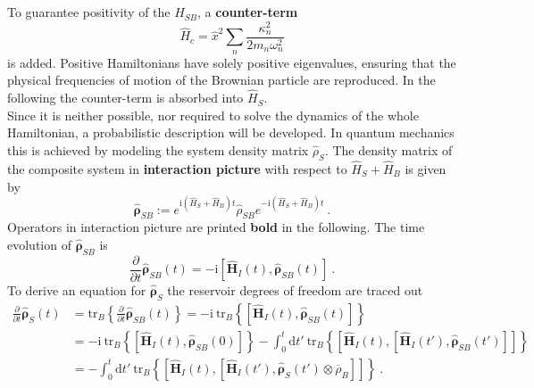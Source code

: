 	To guarantee positivity of the $\hat{H}_{SB}$, a \textbf{counter-term}
	\begin{equation}
		\hat{H}_c =	\hat{x}^2 \sum_n \frac{\kappa_n^2}{2 m_n \omega_n^2} 
	\end{equation}
	is added. Positive Hamiltonians have solely positive eigenvalues, ensuring that the physical frequencies of motion of the Brownian particle are reproduced. In the following the counter-term is absorbed into $\hat{H}_S$. \\
	
	Since it is neither possible, nor required to solve the dynamics of the whole Hamiltonian, a probabilistic description will be developed. In quantum mechanics this is achieved by modeling the system density matrix $\hat{\rho}_{S}$. The density matrix of the composite system in \textbf{interaction picture} with respect to $\hat{H}_S + \hat{H}_B$ is given by
	\begin{equation}
		\boldsymbol{\hat{\rho}}_{SB} :=	e^{\mathrm{i} \left(\hat{H}_S + \hat{H}_B\right)t} \hat{\rho}_{SB} e^{-\mathrm{i} \left(\hat{H}_S + \hat{H}_B\right)t} ~.
	\end{equation}
	Operators in interaction picture are printed \textbf{bold} in the following. The time evolution of $\boldsymbol{\hat{\rho}}_{SB}$ is
	\begin{equation} \label{Eq::OQS-Startpoint}
		\frac{\partial}{\partial t}\boldsymbol{\hat{\rho}}_{SB}(t) =	- \mathrm{i} \left[\boldsymbol{\hat{H}}_I(t), \boldsymbol{\hat{\rho}}_{SB}(t) \right] ~.
	\end{equation}
	To derive an equation for $\boldsymbol{\hat{\rho}}_S$ the reservoir degrees of freedom are traced out
	\begin{equation} \label{Eq::Tracing-Out-Reservoir}
		\begin{split}
			\frac{\partial}{\partial t} \boldsymbol{\hat{\rho}}_S(t) &=	\text{tr}_B \left \lbrace \frac{\partial}{\partial t} \boldsymbol{\hat{\rho}}_{SB}(t) \right \rbrace =	-\mathrm{i}~\text{tr}_B \left\lbrace \left[\boldsymbol{\hat{H}}_I(t), \boldsymbol{\hat{\rho}}_{SB}(t)\right] \right\rbrace  \\
			&=	-\mathrm{i}~\text{tr}_B \left\lbrace \left[\boldsymbol{\hat{H}}_I(t), \boldsymbol{\hat{\rho}}_{SB}(0)\right] \right \rbrace - \int_{0}^{t} \text{d}t'~ \text{tr}_B \left\{  \left[\boldsymbol{\hat{H}}_I(t), \left[\boldsymbol{\hat{H}}_I(t'), \boldsymbol{\hat{\rho}}_{SB}(t') \right]\right]  \right\} \\
			&=- \int_{0}^{t} \text{d}t'~ \text{tr}_B \left\{  \left[\boldsymbol{\hat{H}}_I(t), \left[\boldsymbol{\hat{H}}_I(t'), \boldsymbol{\hat{\rho}}_S(t') \otimes \overline{\rho}_B \right]\right]  \right\}~.
		\end{split}
	\end{equation}
